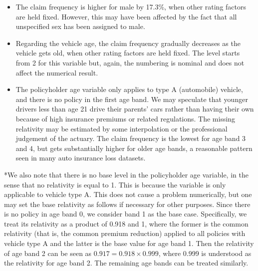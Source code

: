 \documentclass[]{book}
\theoremstyle{definition}
\theoremstyle{definition}
\theoremstyle{definition}
\theoremstyle{remark}
\begin{document}
\begin{itemize}
\item
  The claim frequency is higher for male by 17.3\%, when other rating
  factors are held fixed. However, this may have been affected by the
  fact that all unspecified sex has been assigned to male.
\item
  Regarding the vehicle age, the claim frequency gradually decreases as
  the vehicle gets old, when other rating factors are held fixed. The
  level starts from 2 for this variable but, again, the numbering is
  nominal and does not affect the numerical result.
\item
  The policyholder age variable only applies to type A (automobile)
  vehicle, and there is no policy in the first age band. We may
  speculate that younger drivers less than age 21 drive their parents'
  cars rather than having their own because of high insurance premiums
  or related regulations. The missing relativity may be estimated by
  some interpolation or the professional judgement of the actuary. The
  claim frequency is the lowest for age band 3 and 4, but gets
  substantially higher for older age bands, a reasonable pattern seen in
  many auto insurance loss datasets.
\end{itemize}

*We also note that there is no base level in the policyholder age
variable, in the sense that no relativity is equal to 1. This is because
the variable is only applicable to vehicle type A. This does not cause a
problem numerically, but one may set the base relativity as follows if
necessary for other purposes. Since there is no policy in age band 0, we
consider band 1 as the base case. Specifically, we treat its relativity
as a product of 0.918 and 1, where the former is the common relativity
(that is, the common premium reduction) applied to all policies with
vehicle type A and the latter is the base value for age band 1. Then the
relativity of age band 2 can be seen as \(0.917=0.918 \times 0.999\),
where 0.999 is understood as the relativity for age band 2. The
remaining age bands can be treated similarly.
\end{document}
